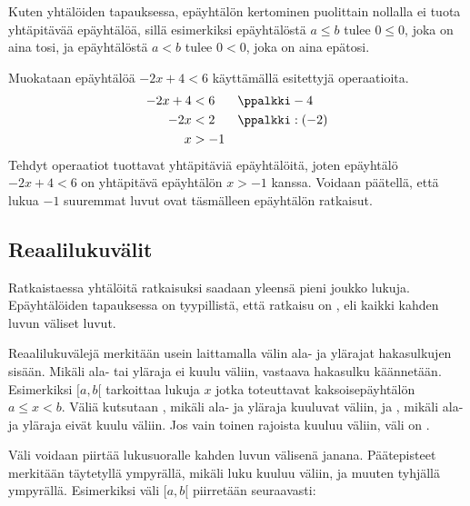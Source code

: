 
Kuten yhtälöiden tapauksessa, epäyhtälön kertominen puolittain nollalla ei tuota yhtäpitävää epäyhtälöä, sillä esimerkiksi epäyhtälöstä $a \leq b$ tulee $0 \leq 0$, joka on aina tosi, ja epäyhtälöstä $a < b$ tulee $0 < 0$, joka on aina epätosi.

\begin{esimerkki}
Muokataan epäyhtälöä $-2x+4<6$ käyttämällä esitettyjä operaatioita.
\begin{align*}
-2x+4&<6 && \ppalkki -4 \\
-2x&<2 && \ppalkki :(-2) \\
x&>-1
\end{align*}
Tehdyt operaatiot tuottavat yhtäpitäviä epäyhtälöitä, joten epäyhtälö $-2x+4<6$ on yhtäpitävä epäyhtälön $x>-1$ kanssa. Voidaan päätellä, että lukua $-1$ suuremmat luvut ovat täsmälleen epäyhtälön ratkaisut.
\end{esimerkki}

\subsection*{Reaalilukuvälit}

Ratkaistaessa yhtälöitä ratkaisuksi saadaan yleensä pieni joukko lukuja. Epäyhtälöiden tapauksessa on tyypillistä, että ratkaisu on , eli kaikki kahden luvun väliset luvut.

Reaalilukuvälejä merkitään usein laittamalla välin ala- ja ylärajat hakasulkujen sisään. Mikäli ala- tai yläraja ei kuulu väliin, vastaava hakasulku käännetään. Esimerkiksi $[a, b[$ tarkoittaa lukuja $x$ jotka toteuttavat kaksoisepäyhtälön $a \leq x < b$. Väliä kutsutaan , mikäli ala- ja yläraja kuuluvat väliin, ja , mikäli ala- ja yläraja eivät kuulu väliin. Jos vain toinen rajoista kuuluu väliin, väli on .

Väli voidaan piirtää lukusuoralle kahden luvun välisenä janana. Päätepisteet merkitään täytetyllä ympyrällä, mikäli luku kuuluu väliin, ja muuten tyhjällä ympyrällä. Esimerkiksi väli $[a, b[$ piirretään seuraavasti:

